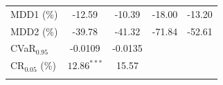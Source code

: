 \documentclass[pdf,9pt,xcolor=dvipsnames,hide notes]{beamer}
\begin{document}
\begin{frame}
\begin{threeparttable}[H]
\begin{tabularx}{\textwidth}{@{\extracolsep{\fill}}lcccc@{}}
			MDD1 (\%) & -12.59 & -10.39 & -18.00 & -13.20 \\
			MDD2 (\%) & -39.78 & -41.32 & -71.84 & -52.61 \\
			CVaR$_{0.95}$ & -0.0109 & -0.0135 &  & \\
			CR$_{0.05}$ (\%) & $12.86^{***}$ & 15.57 &  &  \\
			\bottomrule &  &  &  &
		\end{tabularx}%
		\label{tab:table02}%
	\end{threeparttable}

	
\end{frame}
\end{document}
